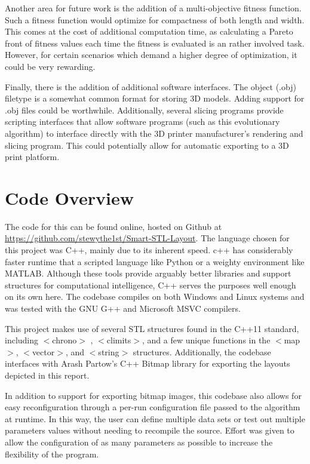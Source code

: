 \documentclass[conference]{IEEEtran}
\begin{document}
Another area for future work is the addition of a multi-objective fitness function. Such a fitness function would optimize for compactness of both length and width. This comes at the cost of additional computation time, as calculating a Pareto front of fitness values each time the fitness is evaluated is an rather involved task. However, for certain scenarios which demand a higher degree of optimization, it could be very rewarding. 

Finally, there is the addition of additional software interfaces. The object (.obj) filetype is a somewhat common format for storing 3D models. Adding support for .obj files could be worthwhile. Additionally, several slicing programs \cite{cura} provide scripting interfaces that allow software programs (such as this evolutionary algorithm) to interface directly with the 3D printer manufacturer's rendering and slicing program. This could potentially allow for automatic exporting to a 3D print platform.

\section{Code Overview}
The code for this can be found online, hosted on Github at \href{https://github.com/stewythe1st/Smart-STL-Layout}{https://github.com/stewythe1st/Smart-STL-Layout}. The language chosen for this project was C++, mainly due to its inherent speed. c++ has considerably faster runtime that a scripted language like Python or a weighty environment like MATLAB. Although these tools provide arguably better libraries and support structures for computational intelligence, C++ serves the purposes well enough on its own here. The codebase compiles on both Windows and Linux systems and was tested with the GNU G++ and Microsoft MSVC compilers.

This project makes use of several STL structures found in the C++11 standard, including $<$chrono$>$ , $<$climits$>$, and a few unique functions in the $<$map$>$, $<$vector$>$, and $<$string$>$ structures. Additionally, the codebase interfaces with Arash Partow's C++ Bitmap library\cite{bmp_library} for exporting the layouts depicted in this report. 

In addition to support for exporting bitmap images, this codebase also allows for easy reconfiguration through a per-run configuration file passed to the algorithm at runtime. In this way, the user can define multiple data sets or test out multiple parameters values without needing to recompile the source. Effort was given to allow the configuration of as many parameters as possible to increase the flexibility of the program.
\end{document}
